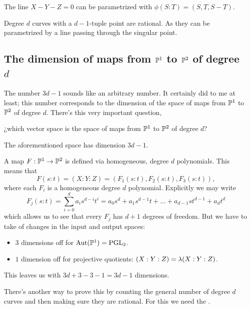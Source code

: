\documentclass[12pt]{memoir}
\begin{document}
\begin{Ex}
    The line $X-Y-Z=0$ can be parametrized with $\phi(S:T)=(S,T,S-T)$. 
\end{Ex}

\begin{Ex}
    Degree $d$ curves with a $d-1$-tuple point are rational. As they can be parametrized by a line passing through the singular point. 
\end{Ex}

\subsection{The dimension of maps from $\mathbb{P}^1$ to $\mathbb{P}^2$ of degree $d$}

The number $3d-1$ sounds like an arbitrary number. It certainly did to me at least; this number corresponds to the dimension of the space of maps from $\mathbb{P}^1$ to $\mathbb{P}^2$ of degree $d$. There's this very important question, 
\begin{significant}
¿which vector space is the space of maps from $\mathbb{P}^1$ to $\mathbb{P}^2$  of degree $d$?
\end{significant}

\begin{Prop}\label{prop-dimension-maps-P1-to-P2}
The aforementioned space has dimension $3d-1$.
\end{Prop}

\begin{ptcbp}
A map $F:\mathbb{P}^1\to\mathbb{P}^2$ is defined via homogeneous, degree $d$ polynomials. This means that 
$$F(s:t)=(X:Y:Z)=(F_1(s:t),F_2(s:t),F_3(s:t)),$$
where each $F_i$ is a homogeneous degree $d$ polynomial. Explicitly we may write 
$$F_j(s:t)=\sum_{i=0}^da_is^{d-i}t^{i}=a_0s^d+a_1s^{d-1}t+\dots+a_{d-1}st^{d-1}+a_dt^d$$
which allows us to see that every $F_j$ has $d+1$ degrees of freedom. But we have to take of changes in the input and output spaces:
\begin{itemize}
    \item $3$ dimensions off for $\operatorname{Aut}(\mathbb{P}^1)=\operatorname{PGL}_2$.
    \item $1$ dimension off for projective quotients: $(X:Y:Z)=\lambda(X:Y:Z)$.
\end{itemize}
This leaves us with $3d+3-3-1=3d-1$ dimensions. 
\end{ptcbp}

There's another way to prove this by counting the general number of degree $d$ curves and then making sure they are rational. For this we need the .
\end{document}

